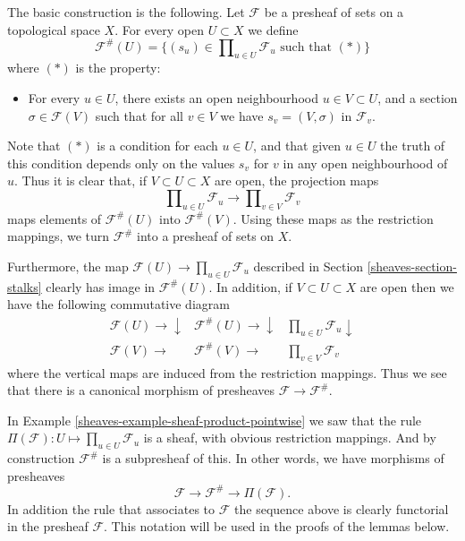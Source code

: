 \medskip\noindent
The basic construction is the following. Let $\mathcal{F}$ be a presheaf
of sets on a topological space $X$.
For every open $U \subset X$ we define
$$
\mathcal{F}^{\#}(U)
=
\{
(s_u) \in \prod\nolimits_{u \in U} \mathcal{F}_u
\text{ such that }(*)
\}
$$
where $(*)$ is the property:
\begin{itemize}
\item[(*)] For every $u \in U$, there exists an open neighbourhood
$u \in V \subset U$, and a section $\sigma \in \mathcal{F}(V)$
such that for all $v \in V$ we have $s_v = (V, \sigma)$
in $\mathcal{F}_v$.
\end{itemize}
Note that $(*)$ is a condition for each $u \in U$,
and that given $u \in U$ the truth of this condition
depends only on the values $s_v$ for $v$ in any open neighbourhood
of $u$. Thus it is clear that,
if $V \subset U \subset X$ are open, the projection maps
$$
\prod\nolimits_{u \in U} \mathcal{F}_u
\longrightarrow
\prod\nolimits_{v \in V} \mathcal{F}_v
$$
maps elements of $\mathcal{F}^{\#}(U)$ into $\mathcal{F}^{\#}(V)$.
Using these maps as the restriction mappings, we turn $\mathcal{F}^\#$
into a presheaf of sets on $X$.

\medskip\noindent
Furthermore, the map $\mathcal{F}(U) \to \prod_{u \in U} \mathcal{F}_u$
described in Section \ref{sheaves-section-stalks} clearly has image
in $\mathcal{F}^{\#}(U)$. In addition, if $V \subset U \subset X$ are
open then we have the following commutative diagram
$$
\begin{array}{ccc}\mathcal{F}(U) \longrightarrow\downarrow & \mathcal{F}^{\#}(U) \longrightarrow\downarrow & \prod_{u\in U} \mathcal{F}_u \downarrow \\ \mathcal{F}(V) \longrightarrow & \mathcal{F}^{\#}(V) \longrightarrow & \prod_{v\in V} \mathcal{F}_v\end{array}
$$
where the vertical maps are induced from the
restriction mappings. Thus we see that
there is a canonical morphism of presheaves
$\mathcal{F} \to \mathcal{F}^{\#}$.

\medskip\noindent
In Example \ref{sheaves-example-sheaf-product-pointwise} we saw
that the rule $\Pi(\mathcal{F}) : U \mapsto \prod_{u\in U} \mathcal{F}_u$
is a sheaf, with obvious restriction mappings. And by construction
$\mathcal{F}^{\#}$ is a subpresheaf of this. In other words, we
have morphisms of presheaves
$$
\mathcal{F} \to \mathcal{F}^\# \to \Pi(\mathcal{F}).
$$
In addition the rule that associates to $\mathcal{F}$
the sequence above is clearly functorial in the presheaf $\mathcal{F}$.
This notation will be
used in the proofs of the lemmas below.

